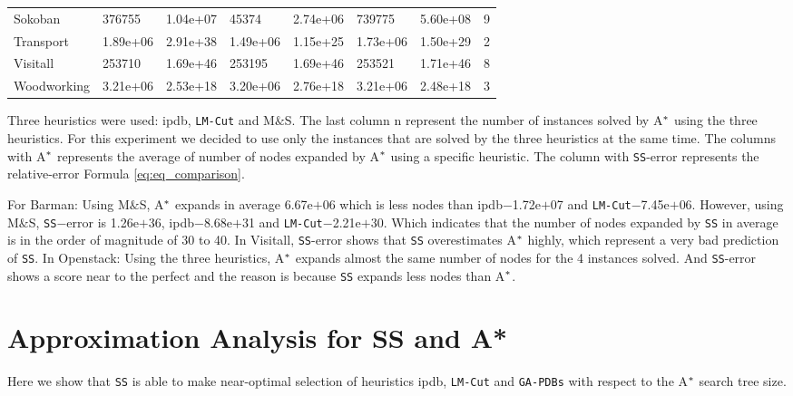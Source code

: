 \begin{table}[!htb]
\begin{tabular}{lR{2cm}R{2cm}R{2cm}R{2cm}R{2cm}R{2cm}C{2cm}}
Sokoban              & 376755      & 1.04e+07   & 45374             & 2.74e+06          & 739775       & 5.60e+08    & 9                  \\
Transport            & 1.89e+06    & 2.91e+38   & 1.49e+06          & 1.15e+25          & 1.73e+06     & 1.50e+29    & 2                  \\
Visitall             & 253710      & 1.69e+46   & 253195            & 1.69e+46          & 253521       & 1.71e+46    & 8                  \\
Woodworking          & 3.21e+06    & 2.53e+18   & 3.20e+06          & 2.76e+18          & 3.21e+06     & 2.48e+18    & 3                  \\ \hline
\end{tabular}
\end{table}

Three heuristics were used: ipdb, \texttt{LM-Cut} and M$\&$S.  The last column \textsf{n} represent the number of instances solved by A$\sp{*}$ using the three heuristics. For this experiment we decided to use only the instances that are solved by the three heuristics at the same time. The columns with A$\sp{*}$ represents the average of number of nodes expanded by A$\sp{*}$ using a specific heuristic. The column with \texttt{SS}-error represents the relative-error Formula \ref{eq:eq_comparison}.

For Barman: Using M$\&$S, A$\sp{*}$ expands in average 6.67e$+$06 which is less nodes than ipdb$-$1.72e$+$07 and \texttt{LM-Cut}$-$7.45e$+$06. However, using M$\&$S, \texttt{SS}$-$error is 1.26e$+$36, ipdb$-$8.68e$+$31 and \texttt{LM-Cut}$-$2.21e$+$30. Which indicates that the number of nodes expanded by \texttt{SS} in average is in the order of magnitude of 30 to 40. In Visitall, \texttt{SS}-error shows that \texttt{SS} overestimates A$\sp{*}$ highly, which represent a very bad prediction of \texttt{SS}. In Openstack: Using the three heuristics, A$\sp{*}$ expands almost the same number of nodes for the 4 instances solved. And \texttt{SS}-error shows a score near to the perfect and the reason is because \texttt{SS} expands less nodes than A$\sp{*}$.

\section{Approximation Analysis for SS and A*}
\noindent
Here we show that \texttt{SS} is able to make near-optimal selection of heuristics ipdb, \texttt{LM-Cut} and \texttt{GA-PDBs} with respect to the A$\sp{*}$ search tree size.


